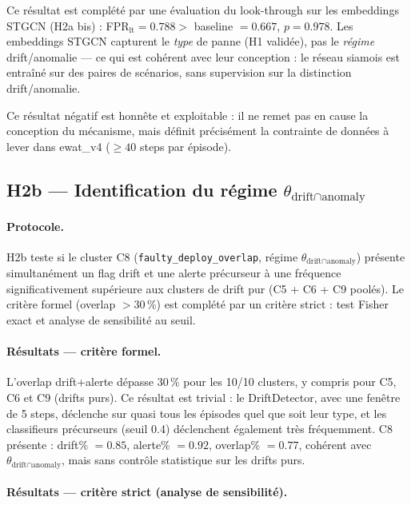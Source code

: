 Ce résultat est complété par une évaluation du look-through sur les embeddings STGCN
(H2a bis) : FPR$_\text{lt} = 0.788 >$ baseline $= 0.667$, $p = 0.978$. Les embeddings
STGCN capturent le \emph{type} de panne (H1 validée), pas le \emph{régime}
drift/anomalie --- ce qui est cohérent avec leur conception : le réseau siamois
est entraîné sur des paires de scénarios, sans supervision sur la distinction
drift/anomalie.

Ce résultat négatif est honnête et exploitable : il ne remet pas en cause la conception
du mécanisme, mais définit précisément la contrainte de données à lever dans ewat\_v4
($\geq 40$ steps par épisode).

\subsection{H2b --- Identification du régime $\theta_{\text{drift} \cap \text{anomaly}}$}
\label{sec:h2b}

\paragraph{Protocole.}
H2b teste si le cluster C8 (\texttt{faulty\_deploy\_overlap}, régime
$\theta_{\text{drift} \cap \text{anomaly}}$) présente simultanément un flag drift
et une alerte précurseur à une fréquence significativement supérieure aux clusters
de drift pur (C5 + C6 + C9 poolés). Le critère formel (overlap $> 30$\,\%) est
complété par un critère strict : test Fisher exact et analyse de sensibilité au seuil.

\paragraph{Résultats --- critère formel.}
L'overlap drift+alerte dépasse 30\,\% pour les 10/10 clusters, y compris pour C5, C6
et C9 (drifts purs). Ce résultat est trivial : le DriftDetector, avec une fenêtre de
5 steps, déclenche sur quasi tous les épisodes quel que soit leur type, et les classifieurs
précurseurs (seuil 0.4) déclenchent également très fréquemment.
C8 présente : drift\% $= 0.85$, alerte\% $= 0.92$, overlap\% $= 0.77$, cohérent avec
$\theta_{\text{drift} \cap \text{anomaly}}$, mais sans contrôle statistique sur les drifts purs.

\paragraph{Résultats --- critère strict (analyse de sensibilité).}

